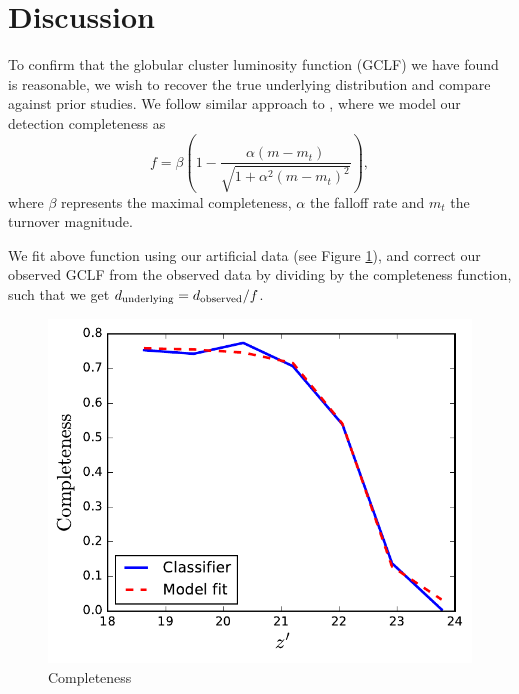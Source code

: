 \documentclass[useAMS,usenatbib]{mn2e}
\begin{document}
\section{Discussion}
\label{sec:discussion}


To confirm that the globular cluster luminosity function (GCLF) we have found is reasonable, we wish to recover the true underlying distribution and compare against prior studies. We follow similar approach to \citet{Wehner2008, Alamo2012, Salinas2015}, where we model our detection completeness as
\begin{equation}
f = \beta \left( 1 - \frac{\alpha(m - m_t)}{\sqrt{1 + \alpha^2 (m -m_t)^2}} \right),
\end{equation}
where $\beta$ represents the maximal completeness, $\alpha$ the falloff rate and $m_t$ the turnover magnitude.

We fit above function using our artificial data (see Figure \ref{fig:completeness}), and correct our observed GCLF from the observed data by dividing by the completeness function, such that we get $d_{\rm{underlying}} = d_{\rm{observed}} / f$.


\begin{figure}
	\includegraphics[width=\columnwidth]{images/completeness.pdf}
	\caption{Completeness}
	\label{fig:completeness}
\end{figure}
\end{document}
